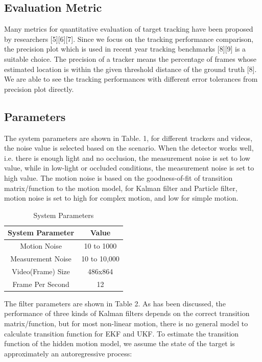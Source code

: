 \documentclass[10pt,twocolumn,letterpaper]{article}
\begin{document}
\subsection{Evaluation Metric}

Many metrics for quantitative evaluation of target tracking have been proposed by researchers [5][6][7]. Since we focus on the tracking performance comparison, the precision plot which is used in recent year tracking benchmarks [8][9] is a suitable choice. The precision of a tracker means the percentage of frames whose estimated location is within the given threshold distance of the ground truth [8]. We are able to see the tracking performances with different error tolerances from precision plot directly.

\subsection{Parameters}

The system parameters are shown in Table. 1, for different trackers and videos, the noise value is selected based on the scenario. When the detector works well, i.e. there is enough light and no occlusion, the measurement noise is set to low value, while in low-light or occluded conditions, the measurement noise is set to high value. The motion noise is based on the goodness-of-fit of transition matrix/function to the motion model, for Kalman filter and Particle filter, motion noise is set to high for complex motion, and low for simple motion.

\begin{table}[h!]
  \centering
  \caption{System Parameters}
  \label{tab:table1}
  \begin{tabular}{|c|c|}
    \toprule
    \textbf{System Parameter} & \textbf{Value}  \\ \hline
    \midrule
  Motion Noise & 10 to 1000  \\ \hline
    Measurement Noise & 10 to 10,000  \\ \hline
    Video(Frame) Size & 486x864  \\ \hline
    Frame Per Second & 12  \\ 
    \bottomrule
  \end{tabular}
\end{table}

The filter parameters are shown in Table 2. As has been discussed, the performance of three kinds of Kalman filters depends on the correct transition matrix/function, but for most non-linear motion, there is no general model to calculate transition function for EKF and UKF. To estimate the transition function of the hidden motion model, we assume the state of the target is approximately an autoregressive process:
\end{document}
